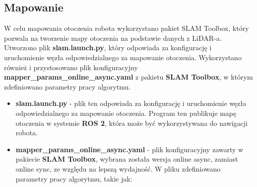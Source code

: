 \documentclass[a4paper,twoside,12pt]{book}
\begin{document}
\subsection{Mapowanie}
W celu mapowania otoczenia robota wykorzystano pakiet SLAM Toolbox, który pozwala na tworzenie mapy otoczenia na podstawie danych z LiDAR-a. Utworzono plik \textbf{slam.launch.py}, który odpowiada za konfigurację i uruchomienie węzła odpowiedzialnego za mapowanie otoczenia. Wykorzystano również i przystosowano plik konfiguracyjny \textbf{mapper\_params\_online\_async.yaml} z pakietu \textbf{SLAM Toolbox}, w którym zdefiniowano parametry pracy algorytmu.
\begin{itemize}
	\item \textbf{slam.launch.py} - plik ten odpowiada za konfigurację i uruchomienie węzła odpowiedzialnego za mapowanie otoczenia. 
	Program ten publikuje mapę otoczenia w systemie \textbf{ROS 2}, która może być wykorzystywana do nawigacji robota.
	\item \textbf{mapper\_params\_online\_async.yaml} - plik konfiguracyjny zawarty w pakiecie \textbf{SLAM Toolbox}, wybrana została wersja online async, zamiast online sync, ze względu na lepszą wydajność. W pliku zdefiniowano parametry pracy algorytmu, takie jak:
	

\end{itemize}
\end{document}
